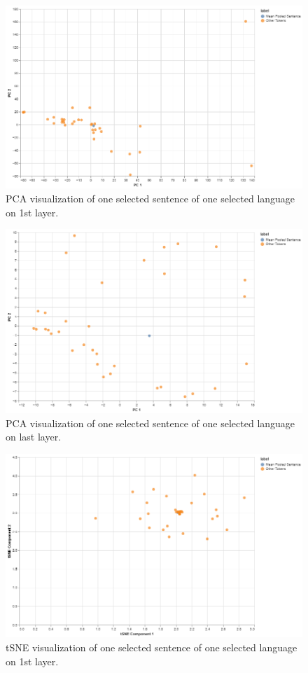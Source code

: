 \documentclass[11pt]{article}
\begin{document}
\begin{figure}[ht]
\centering
\includegraphics[width=0.9\columnwidth]{oneSentenceLang_firstLayer_pca.png}
\caption{PCA visualization of one selected sentence of one selected language on 1st layer.}
\end{figure}


\begin{figure}[ht]
\centering
\includegraphics[width=0.9\columnwidth]{oneSentenceLang_lastLayer_pca.png}
\caption{PCA visualization of one selected sentence of one selected language on last layer.}
\end{figure}


\begin{figure}[ht]
\centering
\includegraphics[width=0.9\columnwidth]{oneSentenceLang_firstLayer_tsne.png}
\caption{tSNE visualization of one selected sentence of one selected language on 1st layer.}
\end{figure}
\end{document}
